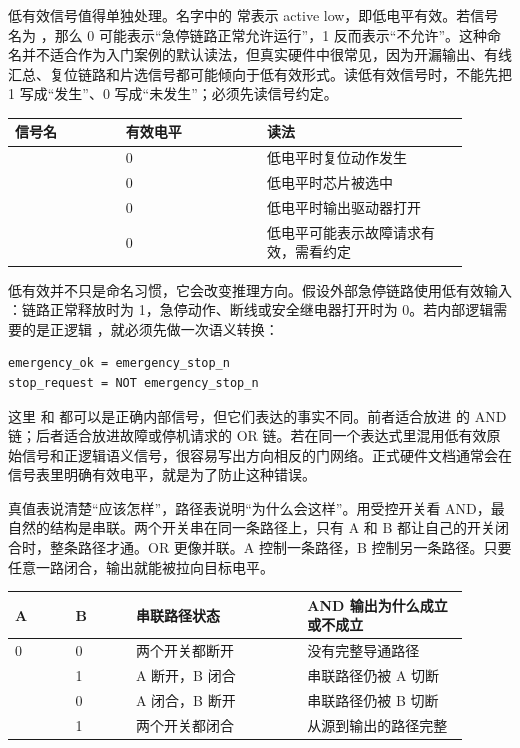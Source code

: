 低有效信号值得单独处理。名字中的  常表示 active low，即低电平有效。若信号名为 ，那么 0 可能表示“急停链路正常允许运行”，1 反而表示“不允许”。这种命名并不适合作为入门案例的默认读法，但真实硬件中很常见，因为开漏输出、有线汇总、复位链路和片选信号都可能倾向于低有效形式。读低有效信号时，不能先把 1 写成“发生”、0 写成“未发生”；必须先读信号约定。

\begin{longtable}{L{0.22\linewidth}L{0.28\linewidth}L{0.4\linewidth}}
\toprule
信号名 & 有效电平 & 读法 \\
\midrule
{} & 0 & 低电平时复位动作发生 \\\tablerowrule
{} & 0 & 低电平时芯片被选中 \\\tablerowrule
{} & 0 & 低电平时输出驱动器打开 \\\tablerowrule
{} & 0 & 低电平可能表示故障请求有效，需看约定 \\
\bottomrule
\end{longtable}

低有效并不只是命名习惯，它会改变推理方向。假设外部急停链路使用低有效输入 ：链路正常释放时为 1，急停动作、断线或安全继电器打开时为 0。若内部逻辑需要的是正逻辑 ，就必须先做一次语义转换：

\begin{lstlisting}
emergency_ok = emergency_stop_n
stop_request = NOT emergency_stop_n
\end{lstlisting}

这里  和  都可以是正确内部信号，但它们表达的事实不同。前者适合放进  的 AND 链；后者适合放进故障或停机请求的 OR 链。若在同一个表达式里混用低有效原始信号和正逻辑语义信号，很容易写出方向相反的门网络。正式硬件文档通常会在信号表里明确有效电平，就是为了防止这种错误。

真值表说清楚“应该怎样”，路径表说明“为什么会这样”。用受控开关看 AND，最自然的结构是串联。两个开关串在同一条路径上，只有 A 和 B 都让自己的开关闭合时，整条路径才通。OR 更像并联。A 控制一条路径，B 控制另一条路径。只要任意一路闭合，输出就能被拉向目标电平。

\begin{longtable}{L{0.12\linewidth}L{0.12\linewidth}L{0.34\linewidth}L{0.32\linewidth}}
\toprule
A & B & 串联路径状态 & AND 输出为什么成立或不成立 \\
 & 0 & 两个开关都断开 & 没有完整导通路径 \\ & 1 & A 断开，B 闭合 & 串联路径仍被 A 切断 \\ & 0 & A 闭合，B 断开 & 串联路径仍被 B 切断 \\ & 1 & 两个开关都闭合 & 从源到输出的路径完整 \\
\bottomrule
\end{longtable}

